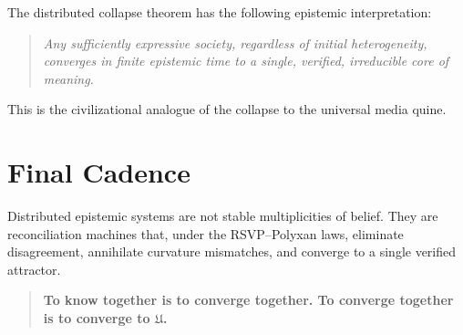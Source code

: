 The distributed collapse theorem has the following epistemic
interpretation:
\begin{quote}
\emph{Any sufficiently expressive society, regardless of initial
heterogeneity, converges in finite epistemic time to a single,
verified, irreducible core of meaning.}
\end{quote}

This is the civilizational analogue of the collapse to the universal
media quine.

\section{Final Cadence}

Distributed epistemic systems are not stable multiplicities of belief.
They are reconciliation machines that, under the RSVP--Polyxan laws,
eliminate disagreement, annihilate curvature mismatches, and converge
to a single verified attractor.

\bigskip

\begin{quote}
\textbf{To know together is to converge together.  
To converge together is to converge to $\mathfrak{U}$.}
\end{quote}
